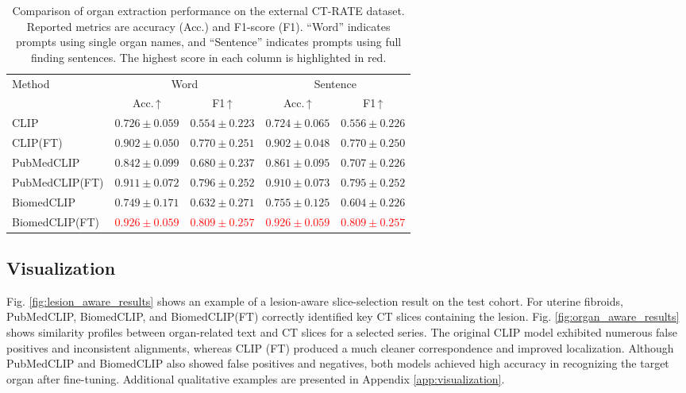\documentclass[bioengineering,article,submit,pdftex,moreauthors]{Definitions/mdpi}
\begin{document}
\begin{table}[ht]
  \centering
  \caption{ Comparison of organ extraction performance on the external CT-RATE dataset. 
  Reported metrics are accuracy (Acc.) and F1-score (F1). 
  “Word” indicates prompts using single organ names, and “Sentence” indicates prompts using full finding sentences. 
  The highest score in each column is highlighted in red.}
  \label{tab:organ_extraction_results_ctrate}
  \begin{tabular}{lcccc}
    \toprule
    \multirow{2}{*}{Method} & \multicolumn{2}{c}{Word}               & \multicolumn{2}{c}{Sentence}           \\
    \cmidrule(lr){2-3}\cmidrule(lr){4-5}
                          & Acc.\,↑ & F1\,↑         & Acc.\,↑   & F1\,↑         \\ 
    \midrule
    CLIP                    & $0.726\pm0.059$ & $0.554\pm0.223$ & $0.724\pm0.065$ & $0.556\pm0.226$ \\
    CLIP(FT)                & $0.902\pm0.050$ & $0.770\pm0.251$ & $0.902\pm0.048$ & $0.770\pm0.250$ \\
    PubMedCLIP              & $0.842\pm0.099$ & $0.680\pm0.237$ & $0.861\pm0.095$ & $0.707\pm0.226$ \\
    PubMedCLIP(FT)          & $0.911\pm0.072$ & $0.796\pm0.252$ & $0.910\pm0.073$ & $0.795\pm0.252$ \\
    BiomedCLIP              & $0.749\pm0.171$ & $0.632\pm0.271$ & $0.755\pm0.125$ & $0.604\pm0.226$ \\
    BiomedCLIP(FT)          & \textcolor{red}{$0.926\pm0.059$} & \textcolor{red}{$0.809\pm0.257$} & \textcolor{red}{$0.926\pm0.059$} & \textcolor{red}{$0.809\pm0.257$} \\
    \bottomrule
  \end{tabular}
\end{table}


\subsection{Visualization}\label{sec:visualization}
Fig. \ref{fig:lesion_aware_results} shows an example of a lesion-aware slice-selection result on the test cohort. 
For uterine fibroids, PubMedCLIP, BiomedCLIP, and BiomedCLIP(FT) correctly identified key CT slices containing the lesion.
Fig. \ref{fig:organ_aware_results} shows similarity profiles between organ-related text and CT slices for a selected series. 
The original CLIP model exhibited numerous false positives and inconsistent alignments, whereas CLIP (FT) produced a much cleaner correspondence and improved localization. 
Although PubMedCLIP and BiomedCLIP also showed false positives and negatives, both models achieved high accuracy in recognizing the target organ after fine-tuning. 
Additional qualitative examples are presented in Appendix \ref{app:visualization}.
\end{document}
